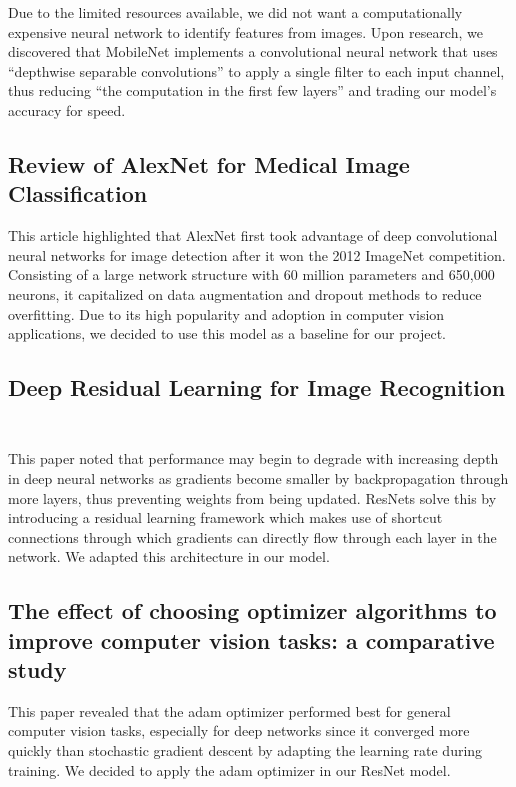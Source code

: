 Due to the limited resources available, we did not want a computationally expensive neural network to identify features from images. Upon research, we discovered that MobileNet implements a convolutional neural network that uses ``depthwise separable convolutions'' to apply a single filter to each input channel, thus reducing ``the computation in the first few layers'' and trading our model's accuracy for speed.

\subsection{Review of AlexNet for Medical Image Classification~\citep{tang2023review}}

This article highlighted that AlexNet first took advantage of deep convolutional neural networks for image detection after it won the 2012 ImageNet competition. Consisting of a large network structure with 60 million parameters and 650,000 neurons, it capitalized on data augmentation and dropout methods to reduce overfitting. Due to its high popularity and adoption in computer vision applications, we decided to use this model as a baseline for our project.

\subsection{Deep Residual Learning for Image Recognition
	~\citep{he2015deep}}

This paper noted that performance may begin to degrade with increasing depth in deep neural networks as gradients become smaller by backpropagation through more layers, thus preventing weights from being updated. ResNets solve this by introducing a residual learning framework which makes use of shortcut connections through which gradients can directly flow through each layer in the network. We adapted this architecture in our model.

\subsection{The effect of choosing optimizer algorithms to improve computer vision tasks: a comparative study~\citep{Hassan}}

This paper revealed that the adam optimizer performed best for general computer vision tasks, especially for deep networks since it converged more quickly than stochastic gradient descent by adapting the learning rate during training. We decided to apply the adam optimizer in our ResNet model.

